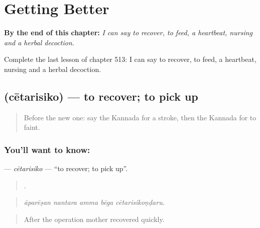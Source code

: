
\chapter{Getting Better}
\label{ch:ka-getting-better}

\begin{chapteropening}
\textbf{By the end of this chapter:} \emph{I can say to recover, to feed, a heartbeat, nursing and a herbal decoction.}

Complete the last lesson of chapter 513: I can say to recover, to feed, a heartbeat, nursing and a herbal decoction.
\end{chapteropening}

\section[\texorpdfstring{\kn{ಚೇತರಿಸಿಕೊ} (cētarisiko)}{ಚೇತರಿಸಿಕೊ (cētarisiko)}]{ (cētarisiko) — to recover; to pick up}

\label{lesson:KA-C513-cetarisiko}



\begin{quote}
Before the new one: say the Kannada for a stroke, then the Kannada for to faint.
\end{quote}

\subsection*{You'll want to know: }
\textbf{} — \emph{cētarisiko} — \textquotedblleft{}to recover; to pick up\textquotedblright{}.

\begin{quote}
    .
\end{quote}

\begin{quote}
\emph{āparēṣan nantara amma bēga cētarisikoṇḍaru.}
\end{quote}

\begin{quote}
After the operation mother recovered quickly.
\end{quote}

